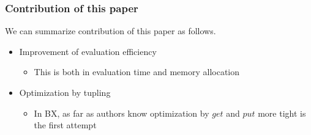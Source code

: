 


\subsubsection*{Contribution of this paper}

We can summarize contribution of this paper as follows.

\begin{itemize}
\item Improvement of evaluation efficiency
  \begin{itemize}
  \item This is both in evaluation time and memory allocation
  \end{itemize}
\item Optimization by tupling
  \begin{itemize}
  \item In BX, as far as authors know optimization by $get$ and $put$ more tight is the first attempt
  \end{itemize}
\end{itemize}


